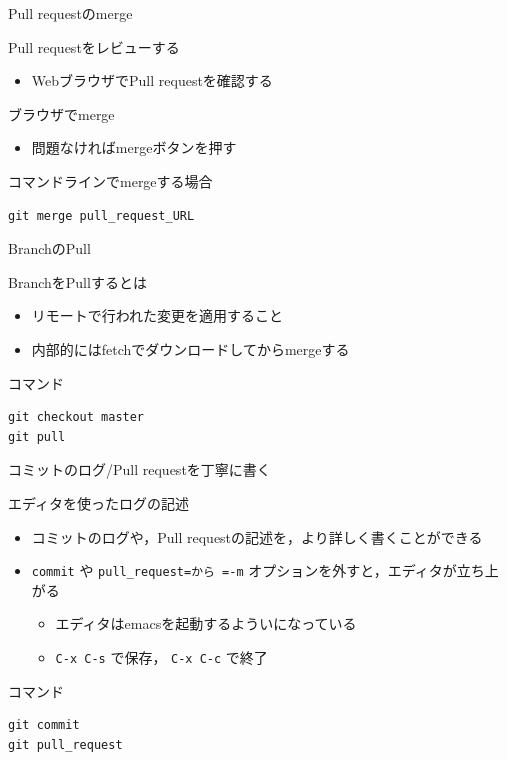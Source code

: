 \documentclass[t, aspectratio=169]{beamer}
\begin{document}
\begin{frame}[fragile,label=sec-3-2-3]{Pull requestのmerge}
 \begin{block}{Pull requestをレビューする}
\begin{itemize}
\item WebブラウザでPull requestを確認する
\end{itemize}
\end{block}
\begin{block}{ブラウザでmerge}
\begin{itemize}
\item 問題なければmergeボタンを押す
\end{itemize}
\end{block}
\begin{block}{コマンドラインでmergeする場合}
\begin{verbatim}
git merge pull_request_URL
\end{verbatim}
\end{block}
\end{frame}

\begin{frame}[fragile,label=sec-3-2-4]{BranchのPull}
 \begin{block}{BranchをPullするとは}
\begin{itemize}
\item リモートで行われた変更を適用すること
\item 内部的にはfetchでダウンロードしてからmergeする
\end{itemize}
\end{block}
\begin{block}{コマンド}
\begin{verbatim}
git checkout master
git pull
\end{verbatim}
\end{block}
\end{frame}

\begin{frame}[fragile,label=sec-3-2-5]{コミットのログ/Pull requestを丁寧に書く}
 \begin{block}{エディタを使ったログの記述}
\begin{itemize}
\item コミットのログや，Pull requestの記述を，より詳しく書くことができる
\item \texttt{commit} や \texttt{pull\_request=から  =-m} オプションを外すと，エディタが立ち上がる
\begin{itemize}
\item エディタはemacsを起動するよういになっている
\item \texttt{C-x C-s} で保存， \texttt{C-x C-c} で終了
\end{itemize}
\end{itemize}
\end{block}
\begin{block}{コマンド}
\begin{verbatim}
git commit
git pull_request
\end{verbatim}
\end{block}
\end{frame}
\end{document}
